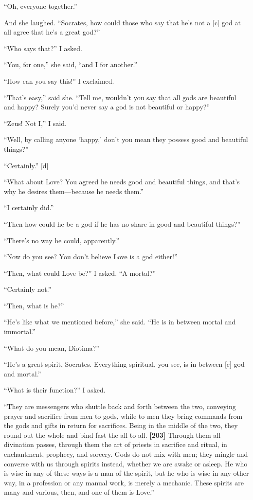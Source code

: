“Oh, everyone together.”

And she laughed. “Socrates, how could those who say that he's not a
{[}c{]} god at all agree that he's a great god?”

“Who says that?” I asked.

“You, for one,” she said, “and I for another.”

“How can you say this!” I exclaimed.

“That's easy,” said she. “Tell me, wouldn't you say that all gods are
beautiful and happy? Surely you'd never say a god is not beautiful or
happy?”

“Zeus! Not I,” I said.

“Well, by calling anyone ‘happy,' don't you mean they possess good and
beautiful things?”

“Certainly.” {[}d{]}

“What about Love? You agreed he needs good and beautiful things, and
that's why he desires them---because he needs them.”

“I certainly did.”

“Then how could he be a god if he has no share in good and beautiful
things?”

“There's no way he could, apparently.”

“Now do you see? You don't believe Love is a god either!”

“Then, what could Love be?” I asked. “A mortal?”

“Certainly not.”

“Then, what is he?”

“He's like what we mentioned before,” she said. “He is in between mortal
and immortal.”

“What do you mean, Diotima?”

“He's a great spirit, Socrates. Everything spiritual, you see, is in
between {[}e{]} god and mortal.”

“What is their function?” I asked.

“They are messengers who shuttle back and forth between the two,
conveying prayer and sacrifice from men to gods, while to men they bring
commands from the gods and gifts in return for sacrifices. Being in the
middle of the two, they round out the whole and bind fast the all to
all. {\bf {[}203{]}} Through them all divination passes, through them
the art of priests in sacrifice and ritual, in enchantment, prophecy,
and sorcery. Gods do not mix with men; they mingle and converse with us
through spirits instead, whether we are awake or asleep. He who is wise
in any of these ways is a man of the spirit, but he who is wise in any
other way, in a profession or any manual work, is merely a mechanic.
These spirits are many and various, then, and one of them is Love.”

